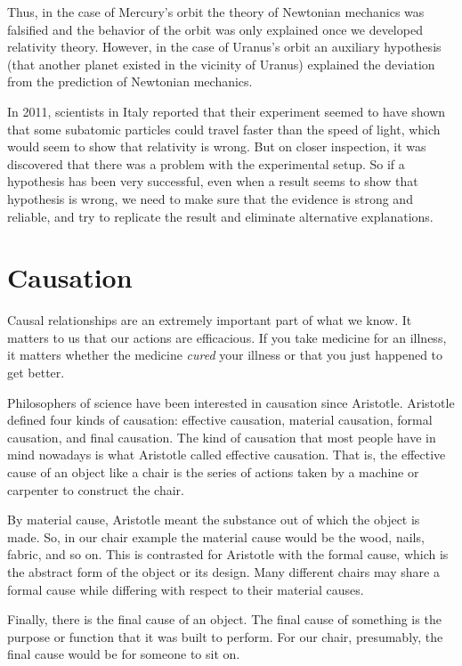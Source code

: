 Thus, in the case of Mercury's orbit the theory of Newtonian mechanics was falsified and the behavior of the orbit was only explained once we developed relativity theory. However, in the case of Uranus's orbit an auxiliary hypothesis (that another planet existed in the vicinity of Uranus) explained the deviation from the prediction of Newtonian mechanics. 

In 2011, scientists in Italy reported that their experiment seemed to have shown that some subatomic particles could travel faster than the speed of light, which would seem to show that relativity is wrong. But on closer inspection, it was discovered that there was a problem with the experimental setup. So if a hypothesis has been very successful, even when a result seems to show that hypothesis is wrong, we need to make sure that the evidence is strong and reliable, and try to replicate the result and eliminate alternative explanations.

\section{Causation}

Causal relationships are an extremely important part of what we know. It matters to us that our actions are efficacious. If you take medicine for an illness, it matters whether the medicine \emph{cured} your illness or that you just happened to get better.

Philosophers of science have been interested in causation since Aristotle. Aristotle defined four kinds of causation: effective causation, material causation, formal causation, and final causation. The kind of causation that most people have in mind nowadays is what Aristotle called effective causation. That is, the effective cause of an object like a chair is the series of actions taken by a machine or carpenter to construct the chair.

By material cause, Aristotle meant the substance out of which the object is made. So, in our chair example the material cause would be the wood, nails, fabric, and so on. This is contrasted for Aristotle with the formal cause, which is the abstract form of the object or its design. Many different chairs may share a formal cause while differing with respect to their material causes.

Finally, there is the final cause of an object. The final cause of something is the purpose or function that it was built to perform. For our chair, presumably, the final cause would be for someone to sit on.

